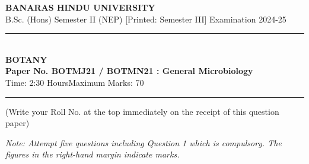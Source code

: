 \documentclass[11pt,a4paper]{article}
\begin{document}
\begin{center}
  {\large\bfseries BANARAS HINDU UNIVERSITY}\\[2pt]
  {\normalsize B.Sc. (Hons) Semester II (NEP) [Printed: Semester III] Examination 2024-25}\\[6pt]
  \rule{0.8\linewidth}{0.5pt}\\[6pt]
  {\large\bfseries BOTANY}\\[4pt]
  {\large\bfseries Paper No. BOTMJ21 / BOTMN21 : General Microbiology}\\[4pt]
  {\normalsize Time: 2:30 Hours\hfill Maximum Marks: 70}
\end{center}

\rule{\linewidth}{0.4pt}

\smallskip



\noindent (Write your Roll No. at the top immediately on the receipt of this question paper)

\smallskip



\noindent   \textit{Note: Attempt five questions including Question 1 which is compulsory. The figures in the right-hand margin indicate marks.}

\bigskip
\end{document}

